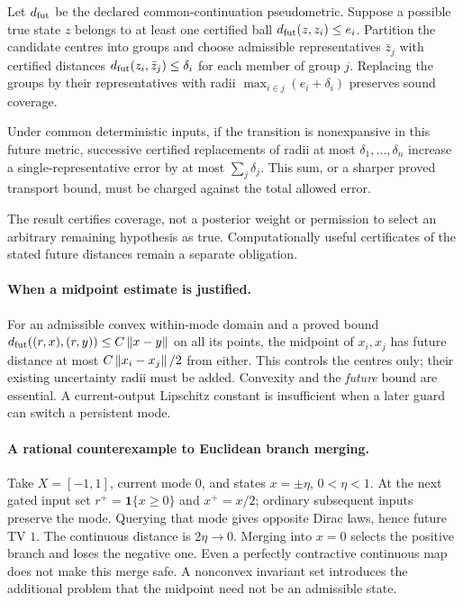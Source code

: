 \begin{proposition}
\label{III:M:prop:future-merge}
Let $d_{\rm fut}$ be the declared common-continuation pseudometric.
Suppose a possible true state $z$ belongs to at least one certified ball
$d_{\rm fut}(z,z_i)\le e_i$. Partition the candidate centres into groups
and choose admissible representatives $\bar z_j$ with certified distances
$d_{\rm fut}(z_i,\bar z_j)\le\delta_i$ for each member of group $j$.
Replacing the groups by their representatives with radii
$\max_{i\in j}(e_i+\delta_i)$ preserves sound coverage.

Under common deterministic inputs, if the transition is nonexpansive in
this future metric, successive certified replacements of radii at most
$\delta_1,\ldots,\delta_n$ increase a single-representative error by at
most $\sum_j\delta_j$. This sum, or a sharper proved transport bound,
must be charged against the total allowed error.
\end{proposition}

The result certifies coverage, not a posterior weight or permission to
select an arbitrary remaining hypothesis as true. Computationally useful
certificates of the stated future distances remain a separate obligation.

\paragraph{When a midpoint estimate is justified.}
For an admissible convex within-mode domain and a proved bound
$d_{\rm fut}((r,x),(r,y))\le C\left\lVert x-y\right\rVert$ on all its points,
the midpoint of $x_i,x_j$ has future distance at most
$C\left\lVert x_i-x_j\right\rVert/2$ from either. This controls the centres only;
their existing uncertainty radii must be added. Convexity and the
\emph{future} bound are essential. A current-output Lipschitz constant
is insufficient when a later guard can switch a persistent mode.

\paragraph{A rational counterexample to Euclidean branch merging.}
Take $X=[-1,1]$, current mode $0$, and states $x=\pm\eta$, $0<\eta<1$.
At the next gated input set $r^+=\mathbf1\{x\ge0\}$ and $x^+=x/2$;
ordinary subsequent inputs preserve the mode. Querying that mode gives
opposite Dirac laws, hence future TV $1$. The continuous distance is
$2\eta\to0$. Merging into $x=0$ selects the positive branch and loses
the negative one. Even a perfectly contractive continuous map does not
make this merge safe. A nonconvex invariant set introduces the additional
problem that the midpoint need not be an admissible state.

